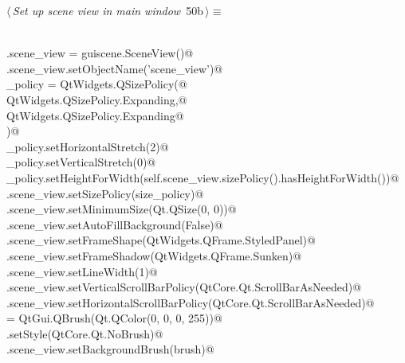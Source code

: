 \documentclass[
    a4paper,      %
    10pt,         %
    openright,    %
    notitlepage,  %
    parskip=half, %
]{scrreprt}       %
\theoremstyle{definition}                    %
\begin{document}
\begin{flushleft} \small
\begin{minipage}{\linewidth}\label{scrap74}\raggedright\small
{} $\langle\,${\itshape Set up scene view in main window}\nobreak\ {\footnotesize {50b}}$\,\rangle\equiv$
\vspace{-1exm}
\begin{list}{}{} \item
\mbox{}\lstinline@@\\
\mbox{}\lstinline@self.scene_view = guiscene.SceneView()@\\
\mbox{}\lstinline@self.scene_view.setObjectName('scene_view')@\\
\mbox{}\lstinline@size_policy = QtWidgets.QSizePolicy(@\\
\mbox{}\lstinline@    QtWidgets.QSizePolicy.Expanding,@\\
\mbox{}\lstinline@    QtWidgets.QSizePolicy.Expanding@\\
\mbox{}\lstinline@)@\\
\mbox{}\lstinline@size_policy.setHorizontalStretch(2)@\\
\mbox{}\lstinline@size_policy.setVerticalStretch(0)@\\
\mbox{}\lstinline@size_policy.setHeightForWidth(self.scene_view.sizePolicy().hasHeightForWidth())@\\
\mbox{}\lstinline@self.scene_view.setSizePolicy(size_policy)@\\
\mbox{}\lstinline@self.scene_view.setMinimumSize(Qt.QSize(0, 0))@\\
\mbox{}\lstinline@self.scene_view.setAutoFillBackground(False)@\\
\mbox{}\lstinline@self.scene_view.setFrameShape(QtWidgets.QFrame.StyledPanel)@\\
\mbox{}\lstinline@self.scene_view.setFrameShadow(QtWidgets.QFrame.Sunken)@\\
\mbox{}\lstinline@self.scene_view.setLineWidth(1)@\\
\mbox{}\lstinline@self.scene_view.setVerticalScrollBarPolicy(QtCore.Qt.ScrollBarAsNeeded)@\\
\mbox{}\lstinline@self.scene_view.setHorizontalScrollBarPolicy(QtCore.Qt.ScrollBarAsNeeded)@\\
\mbox{}\lstinline@brush = QtGui.QBrush(Qt.QColor(0, 0, 0, 255))@\\
\mbox{}\lstinline@brush.setStyle(QtCore.Qt.NoBrush)@\\
\mbox{}\lstinline@self.scene_view.setBackgroundBrush(brush)@\\

\end{list}
\end{minipage}
\end{flushleft}
\end{document}
